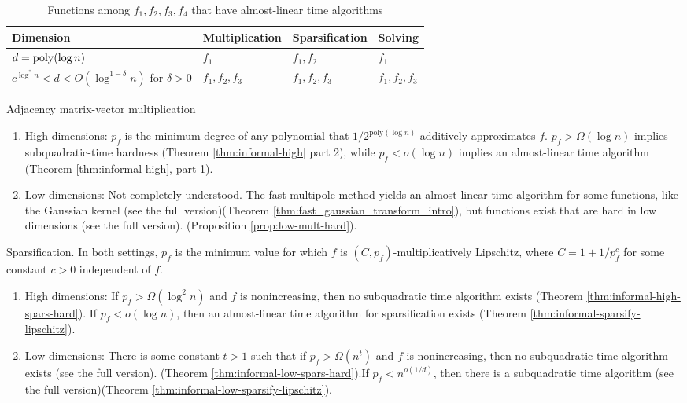 \begin{table*}[!ht]
\centering
\begin{tabular}{|l|l|l|l|}
    \hline
    {\bf Dimension} & {\bf Multiplication} & {\bf Sparsification} & {\bf Solving} \\ \hline
     $d = \mathrm{poly}(\log n)$ & $f_1$ & $f_1,f_2$ & $f_1$\\ \hline
     $c^{\log^* n} < d < O(\log^{1-\delta} n)$ for  $\delta > 0$ & $f_1,f_2,f_3$ & $f_1,f_2,f_3$ & $f_1,f_2,f_3$ \\ \hline
\end{tabular}\caption{Functions among $f_1,f_2,f_3,f_4$ that have almost-linear time algorithms}\label{tab:examples}
\end{table*}


\begin{compactenum}
    \item Adjacency matrix-vector multiplication
    \begin{enumerate}
        \item High dimensions: $p_f$ is the minimum degree of any polynomial that $1/2^{\text{poly}(\log n)}$-additively approximates $f$. $p_f > \Omega(\log n)$ implies subquadratic-time hardness (Theorem \ref{thm:informal-high} part 2), while $p_f < o(\log n)$ implies an almost-linear time algorithm (Theorem \ref{thm:informal-high}, part 1).
        \item Low dimensions: Not completely understood. The fast multipole method yields an almost-linear time algorithm for some functions, like the Gaussian kernel \ifdefined\isfocs(see the full version)\else(Theorem \ref{thm:fast_gaussian_transform_intro})\fi, but functions exist that are hard in low dimensions \ifdefined\isfocs(see the full version).
        \else(Proposition \ref{prop:low-mult-hard}).\fi
    \end{enumerate}
    \item Sparsification. In both settings, $p_f$ is the minimum value for which $f$ is $(C, p_f)$-multiplicatively Lipschitz, where $C = 1 + 1/p_f^c$ for some constant $c > 0$ independent of $f$.
    \begin{enumerate}
        \item High dimensions: If $p_f > \Omega(\log^2 n)$ and $f$ is nonincreasing, then no subquadratic time algorithm exists (Theorem \ref{thm:informal-high-spars-hard}). If $p_f < o(\log n)$, then an almost-linear time algorithm for sparsification exists (Theorem \ref{thm:informal-sparsify-lipschitz}).
        \item Low dimensions: There is some constant $t > 1$ such that if $p_f > \Omega(n^t)$ and $f$ is nonincreasing, then no subquadratic time algorithm exists \ifdefined\isfocs(see the full version). \else(Theorem \ref{thm:informal-low-spars-hard}).\fi If $p_f < n^{o(1/d)}$, then there is a subquadratic time algorithm \ifdefined\isfocs(see the full version)\else(Theorem \ref{thm:informal-low-sparsify-lipschitz})\fi.

\end{enumerate}
\end{compactenum}
